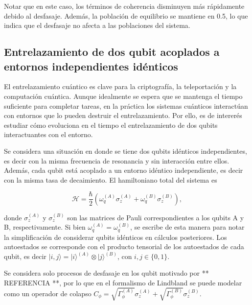 Notar que en este caso, los términos de coherencia disminuyen más rápidamente debido al desfasaje. Además, la población de equilibrio se mantiene en 0.5, lo que indica que el desfasaje no afecta a las poblaciones del sistema.


\subsection{Entrelazamiento de dos qubit acoplados a entornos independientes idénticos} \label{sec: two_qubits}



El entrelazamiento cuántico es clave para la criptografía, la teleportación y la computación cuántica. Aunque idealmente se espera que se mantenga el tiempo suficiente para completar tareas, en la práctica los sistemas cuánticos interactúan con entornos que lo pueden destruir el entrelazamiento. Por ello, es de intererés estudiar cómo evoluciona en el tiempo el entrelazamiento de dos qubits interactuantes con el entorno.

Se considera una situación en donde se tiene dos qubits idénticos independientes, es decir con la misma frecuencia de resonancia y sin interacción entre ellos. Además, cada qubit está acoplado a un entorno idéntico independiente, es decir con la misma tasa de decaimiento. El hamiltoniano total del sistema es

\begin{equation} \label{eq: h_two_qubits}
    \mathcal{H} = \frac{\hbar}{2} \left( \omega_q^{(A)} \sigma_z^{(A)} + \omega_q^{(B)}\sigma_z^{(B)} \right),
\end{equation}

\noindent donde \(\sigma_z^{(A)}\) y \(\sigma_z^{(B)}\) son las matrices de Pauli correspondientes a los qubits A y B, respectivamente. Si bien \(\omega_q^{(A)} = \omega_q^{(B)}\), se escribe de esta manera para notar la simplificación de considerar qubits idénticos en cálculos posteriores. Los autoestados se corresponde con el producto tensorial de los autoestados de cada qubit, es decir \(|i,j\rangle = |i\rangle^{(A)} \otimes |j\rangle^{(B)}\), con \(i,j \in \{0,1\}\). 

Se considera solo procesos de desfasaje en los qubit motivado por ** REFERENCIA **, por lo que en el formalismo de Lindbland se puede modelar como un operador de colapso \(C_\phi = \sqrt{\Gamma_\phi^{(A)}} \sigma_z^{(A)} + \sqrt{\Gamma_\phi^{(B)}} \sigma_z^{(B)}\). 

